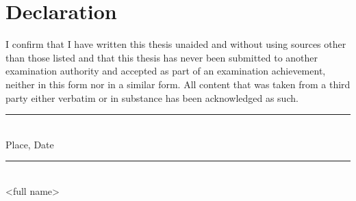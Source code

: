 \chapter*{Declaration}
\thispagestyle{empty}

\noindent
I confirm that I have written this thesis unaided and without using sources other than those listed and that this thesis has never been submitted to another examination authority and accepted as part of an examination achievement, neither in this form nor in a similar form.
All content that was taken from a third party either verbatim or in substance has been acknowledged as such.

\vspace{3cm}

\begin{minipage}[t]{0.45\textwidth}
    \rule{\textwidth}{0.5pt}\\
	Place, Date
\end{minipage}
\hfill
\begin{minipage}[t]{0.45\textwidth}
	\rule{\textwidth}{0.5pt}\\
	<full name>
\end{minipage}
